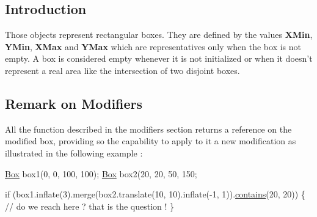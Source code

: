 \hypertarget{classHurricane_1_1Box_secBoxIntro}{}\subsection{Introduction}\label{classHurricane_1_1Box_secBoxIntro}
Those objects represent rectangular boxes. They are defined by the values {\bfseries X\-Min}, {\bfseries Y\-Min}, {\bfseries X\-Max} and {\bfseries Y\-Max} which are representatives only when the box is not empty. A box is considered empty whenever it is not initialized or when it doesn't represent a real area like the intersection of two disjoint boxes.\hypertarget{classHurricane_1_1Box_secBoxModifierRemark}{}\subsection{Remark on Modifiers}\label{classHurricane_1_1Box_secBoxModifierRemark}
All the function described in the modifiers section returns a reference on the modified box, providing so the capability to apply to it a new modification as illustrated in the following example \-: 
\begin{DoxyCode}
\hyperlink{classHurricane_1_1Box_a445dd24bf83759bb47fc483fc7da024f}{Box} box1(0, 0, 100, 100);
\hyperlink{classHurricane_1_1Box_a445dd24bf83759bb47fc483fc7da024f}{Box} box2(20, 20, 50, 150;
 
\textcolor{keywordflow}{if} (box1.inflate(3).merge(box2.translate(10, 10).inflate(-1, 1)).\hyperlink{classHurricane_1_1Box_a978d2622d61acf8a52ee7dccc57f3944}{contains}(20, 20)) \{
   \textcolor{comment}{// do we reach here ? that is the question !}
\}
\end{DoxyCode}
 

